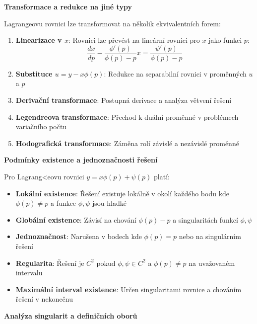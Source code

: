 \noindent\textbf{Transformace a redukce na jiné typy}

Lagrangeovu rovnici lze transformovat na několik ekvivalentních forem:

\begin{enumerate}
\item \textbf{Linearizace v $x$}: Rovnici lze převést na lineární rovnici pro $x$ jako funkci $p$:
\[
\frac{dx}{dp} - \frac{\phi'(p)}{\phi(p) - p}x = \frac{\psi'(p)}{\phi(p) - p}
\]

\item \textbf{Substituce $u = y - x\phi(p)$}: Redukce na separabilní rovnici v proměnných $u$ a $p$

\item \textbf{Derivační transformace}: Postupná derivace a analýza větvení řešení

\item \textbf{Legendreova transformace}: Přechod k duální proměnné v problémech variačního počtu

\item \textbf{Hodografická transformace}: Záměna rolí závislé a nezávislé proměnné
\end{enumerate}

\vspace{1\baselineskip}

\noindent\textbf{Podmínky existence a jednoznačnosti řešení}

Pro Lagrang<eovu rovnici $y = x\phi(p) + \psi(p)$ platí:
\begin{itemize}
\item \textbf{Lokální existence}: Řešení existuje lokálně v okolí každého bodu kde $\phi(p) \neq p$ a funkce $\phi, \psi$ jsou hladké
\item \textbf{Globální existence}: Závisí na chování $\phi(p) - p$ a singularitách funkcí $\phi, \psi$
\item \textbf{Jednoznačnost}: Narušena v bodech kde $\phi(p) = p$ nebo na singulárním řešení
\item \textbf{Regularita}: Řešení je $C^2$ pokud $\phi, \psi \in C^2$ a $\phi(p) \neq p$ na uvažovaném intervalu
\item \textbf{Maximální interval existence}: Určen singularitami rovnice a chováním řešení v nekonečnu
\end{itemize}

\vspace{1\baselineskip}

\noindent\textbf{Analýza singularit a definičních oborů}

